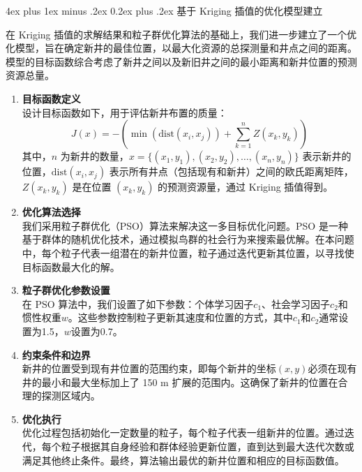 \documentclass[12pt,a4paper]{nmmcm}
\makeatletter
\renewcommand\subsubsection{\@startsection{subsubsection}{3}{1em}%
  {4ex plus 1ex minus .2ex}%
  {0.2ex plus .2ex}%
  {\normalfont\large\bfseries}}
\makeatother
\begin{document}
\subsubsection{基于 Kriging 插值的优化模型建立}

在 Kriging 插值的求解结果和粒子群优化算法的基础上，我们进一步建立了一个优化模型，旨在确定新井的最佳位置，以最大化资源的总探测量和井点之间的距离。模型的目标函数综合考虑了新井之间以及新旧井之间的最小距离和新井位置的预测资源总量。

\begin{enumerate}
  \item \textbf{目标函数定义} \\
        设计目标函数如下，用于评估新井布置的质量：
        \[
          J(x) = -\left(\min(\text{dist}(x_i, x_j)) + \sum_{k=1}^{n} Z(x_k, y_k)\right)
        \]
        其中，$n$ 为新井的数量，$x = \{(x_1, y_1), (x_2, y_2), \ldots, (x_{n}, y_{n})\}$ 表示新井的位置，$\text{dist}(x_i, x_j)$ 表示所有井点（包括现有和新井）之间的欧氏距离矩阵，$Z(x_k, y_k)$ 是在位置 $(x_k, y_k)$ 的预测资源量，通过 Kriging 插值得到。

  \item \textbf{优化算法选择} \\
        我们采用粒子群优化（PSO）算法来解决这一多目标优化问题。PSO 是一种基于群体的随机优化技术，通过模拟鸟群的社会行为来搜索最优解。在本问题中，每个粒子代表一组潜在的新井位置，粒子通过迭代更新其位置，以寻找使目标函数最大化的解。

  \item \textbf{粒子群优化参数设置} \\
        在 PSO 算法中，我们设置了如下参数：个体学习因子$c_1$、社会学习因子$c_2$和惯性权重$w$。这些参数控制粒子更新其速度和位置的方式，其中$c_1$和$c_2$通常设置为1.5，$w$设置为0.7。

  \item \textbf{约束条件和边界} \\
        新井的位置受到现有井位置的范围约束，即每个新井的坐标$(x, y)$必须在现有井的最小和最大坐标加上了 150 m 扩展的范围内。这确保了新井的位置在合理的探测区域内。

  \item \textbf{优化执行} \\
        优化过程包括初始化一定数量的粒子，每个粒子代表一组新井的位置。通过迭代，每个粒子根据其自身经验和群体经验更新位置，直到达到最大迭代次数或满足其他终止条件。最终，算法输出最优的新井位置和相应的目标函数值。
\end{enumerate}
\end{document}
